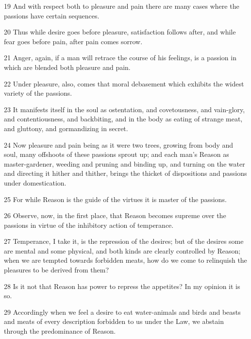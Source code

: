 \par 19 And with respect both to pleasure and pain there are many cases where the passions have certain sequences.

\par 20 Thus while desire goes before pleasure, satisfaction follows after, and while fear goes before pain, after pain comes sorrow.

\par 21 Anger, again, if a man will retrace the course of his feelings, is a passion in which are blended both pleasure and pain.

\par 22 Under pleasure, also, comes that moral debasement which exhibits the widest variety of the passions.

\par 23 It manifests itself in the soul as ostentation, and covetousness, and vain-glory, and contentiousness, and backbiting, and in the body as eating of strange meat, and gluttony, and gormandizing in secret.

\par 24 Now pleasure and pain being as it were two trees, growing from body and soul, many offshoots of these passions sprout up; and each man's Reason as master-gardener, weeding and pruning and binding up, and turning on the water and directing it hither and thither, brings the thicket of dispositions and passions under domestication.

\par 25 For while Reason is the guide of the virtues it is master of the passions.

\par 26 Observe, now, in the first place, that Reason becomes supreme over the passions in virtue of the inhibitory action of temperance.

\par 27 Temperance, I take it, is the repression of the desires; but of the desires some are mental and some physical, and both kinds are clearly controlled by Reason; when we are tempted towards forbidden meats, how do we come to relinquish the pleasures to be derived from them?

\par 28 Is it not that Reason has power to repress the appetites? In my opinion it is so.

\par 29 Accordingly when we feel a desire to eat water-animals and birds and beasts and meats of every description forbidden to us under the Law, we abstain through the predominance of Reason.

